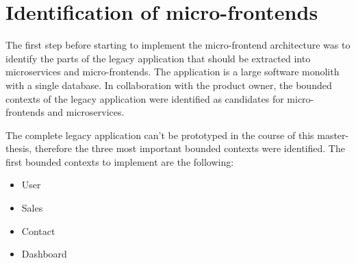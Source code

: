 \section{Identification of micro-frontends}\label{section:applied-methods:identification-micro-frontends}

The first step before starting to implement the micro-frontend architecture was to identify the parts of the legacy application that should be extracted into microservices and micro-frontends. The application is a large software monolith with a single database. In collaboration with the product owner, the bounded contexts of the legacy application were identified as candidates for micro-frontends and microservices. 

\bigskip

\noindent The complete legacy application can't be prototyped in the course of this master-thesis, therefore the three most important bounded contexts were identified. The first bounded contexts to implement are the following:

\begin{itemize}
  \item User
  \item Sales
  \item Contact
  \item Dashboard
\end{itemize}